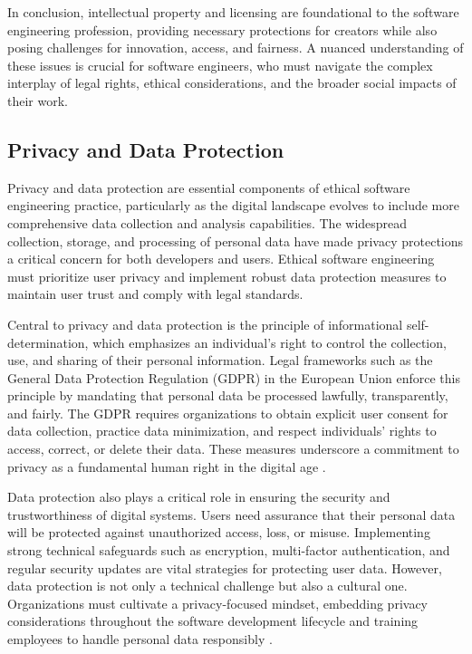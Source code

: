 \begin{refsection}
In conclusion, intellectual property and licensing are foundational to the software engineering profession, providing necessary protections for creators while also posing challenges for innovation, access, and fairness. A nuanced understanding of these issues is crucial for software engineers, who must navigate the complex interplay of legal rights, ethical considerations, and the broader social impacts of their work.

\subsection{Privacy and Data Protection}

Privacy and data protection are essential components of ethical software engineering practice, particularly as the digital landscape evolves to include more comprehensive data collection and analysis capabilities. The widespread collection, storage, and processing of personal data have made privacy protections a critical concern for both developers and users. Ethical software engineering must prioritize user privacy and implement robust data protection measures to maintain user trust and comply with legal standards.

Central to privacy and data protection is the principle of informational self-determination, which emphasizes an individual's right to control the collection, use, and sharing of their personal information. Legal frameworks such as the General Data Protection Regulation (GDPR) in the European Union enforce this principle by mandating that personal data be processed lawfully, transparently, and fairly. The GDPR requires organizations to obtain explicit user consent for data collection, practice data minimization, and respect individuals' rights to access, correct, or delete their data. These measures underscore a commitment to privacy as a fundamental human right in the digital age \cite[pp.~45-48]{voigt2017gdpr}.

Data protection also plays a critical role in ensuring the security and trustworthiness of digital systems. Users need assurance that their personal data will be protected against unauthorized access, loss, or misuse. Implementing strong technical safeguards such as encryption, multi-factor authentication, and regular security updates are vital strategies for protecting user data. However, data protection is not only a technical challenge but also a cultural one. Organizations must cultivate a privacy-focused mindset, embedding privacy considerations throughout the software development lifecycle and training employees to handle personal data responsibly \cite[pp.~112-115]{solove2010understanding}.


\end{refsection}
